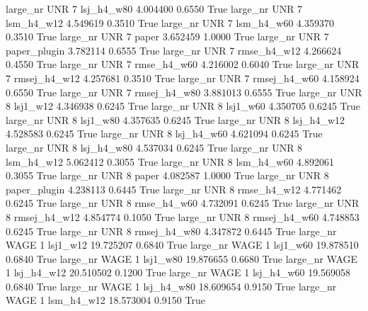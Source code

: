   large_nr      UNR                 7   lsj_h4_w80    4.004400      0.6550    True
  large_nr      UNR                 7   lsm_h4_w12    4.549619      0.3510    True
  large_nr      UNR                 7   lsm_h4_w60    4.359370      0.3510    True
  large_nr      UNR                 7        paper    3.652459      1.0000    True
  large_nr      UNR                 7 paper_plugin    3.782114      0.6555    True
  large_nr      UNR                 7  rmse_h4_w12    4.266624      0.4550    True
  large_nr      UNR                 7  rmse_h4_w60    4.216002      0.6040    True
  large_nr      UNR                 7 rmsej_h4_w12    4.257681      0.3510    True
  large_nr      UNR                 7 rmsej_h4_w60    4.158924      0.6550    True
  large_nr      UNR                 7 rmsej_h4_w80    3.881013      0.6555    True
  large_nr      UNR                 8     lsj1_w12    4.346938      0.6245    True
  large_nr      UNR                 8     lsj1_w60    4.350705      0.6245    True
  large_nr      UNR                 8     lsj1_w80    4.357635      0.6245    True
  large_nr      UNR                 8   lsj_h4_w12    4.528583      0.6245    True
  large_nr      UNR                 8   lsj_h4_w60    4.621094      0.6245    True
  large_nr      UNR                 8   lsj_h4_w80    4.537034      0.6245    True
  large_nr      UNR                 8   lsm_h4_w12    5.062412      0.3055    True
  large_nr      UNR                 8   lsm_h4_w60    4.892061      0.3055    True
  large_nr      UNR                 8        paper    4.082587      1.0000    True
  large_nr      UNR                 8 paper_plugin    4.238113      0.6445    True
  large_nr      UNR                 8  rmse_h4_w12    4.771462      0.6245    True
  large_nr      UNR                 8  rmse_h4_w60    4.732091      0.6245    True
  large_nr      UNR                 8 rmsej_h4_w12    4.854774      0.1050    True
  large_nr      UNR                 8 rmsej_h4_w60    4.748853      0.6245    True
  large_nr      UNR                 8 rmsej_h4_w80    4.347872      0.6445    True
  large_nr     WAGE                 1     lsj1_w12   19.725207      0.6840    True
  large_nr     WAGE                 1     lsj1_w60   19.878510      0.6840    True
  large_nr     WAGE                 1     lsj1_w80   19.876655      0.6680    True
  large_nr     WAGE                 1   lsj_h4_w12   20.510502      0.1200    True
  large_nr     WAGE                 1   lsj_h4_w60   19.569058      0.6840    True
  large_nr     WAGE                 1   lsj_h4_w80   18.609654      0.9150    True
  large_nr     WAGE                 1   lsm_h4_w12   18.573004      0.9150    True

